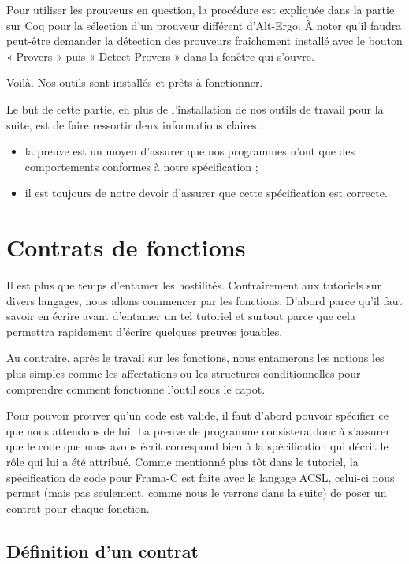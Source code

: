 \documentclass[12pt,francais,]{scrbook}
\providecommand{\tightlist}{%
  \setlength{\itemsep}{0pt}\setlength{\parskip}{0pt}}
\begin{document}
Pour utiliser les prouveurs en question, la procédure est expliquée dans
la partie sur Coq pour la sélection d'un prouveur différent d'Alt-Ergo.
À noter qu'il faudra peut-être demander la détection des prouveurs
fraîchement installé avec le bouton « Provers » puis « Detect Provers »
dans la fenêtre qui s'ouvre.

Voilà. Nos outils sont installés et prêts à fonctionner.

Le but de cette partie, en plus de l'installation de nos outils de
travail pour la suite, est de faire ressortir deux informations claires
:

\begin{itemize}
\tightlist
\item
  la preuve est un moyen d'assurer que nos programmes n'ont que des
  comportements conformes à notre spécification ;
\item
  il est toujours de notre devoir d'assurer que cette spécification est
  correcte.
\end{itemize}

\chapter{Contrats de fonctions}\label{contrats-de-fonctions}

Il est plus que temps d'entamer les hostilités. Contrairement aux
tutoriels sur divers langages, nous allons commencer par les fonctions.
D'abord parce qu'il faut savoir en écrire avant d'entamer un tel
tutoriel et surtout parce que cela permettra rapidement d'écrire
quelques preuves jouables.

Au contraire, après le travail sur les fonctions, nous entamerons les
notions les plus simples comme les affectations ou les structures
conditionnelles pour comprendre comment fonctionne l'outil sous le
capot.

Pour pouvoir prouver qu'un code est valide, il faut d'abord pouvoir
spécifier ce que nous attendons de lui. La preuve de programme
consistera donc à s'assurer que le code que nous avons écrit correspond
bien à la spécification qui décrit le rôle qui lui a été attribué. Comme
mentionné plus tôt dans le tutoriel, la spécification de code pour
Frama-C est faite avec le langage ACSL, celui-ci nous permet (mais pas
seulement, comme nous le verrons dans la suite) de poser un contrat pour
chaque fonction.

\section{Définition d'un contrat}\label{duxe9finition-dun-contrat}
\end{document}
